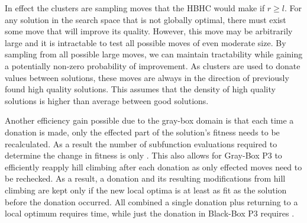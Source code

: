 In effect the clusters are sampling moves that the HBHC
would make if $r \ge l$. For any solution in the search space that is not globally optimal, there
must exist some move that will improve its quality. However, this move may
be arbitrarily large and it is intractable to test all possible moves of even moderate size.
By sampling from all possible large moves, we can maintain tractability while gaining
a potentially non-zero probability of improvement.
As clusters are used to donate values between solutions, these
moves are always in the direction of previously found high quality solutions.
This assumes that the density of high quality solutions is higher than average between good solutions.

Another efficiency gain possible due to the gray-box domain is that each time a
donation is made, only the effected part of the solution's fitness needs to be
recalculated. As a result the number of subfunction evaluations required
to determine the change in fitness is only . This also
allows for Gray-Box P3 to efficiently reapply hill climbing after each
donation as only effected moves need to be rechecked. As a result, a donation
and its resulting modifications from hill climbing are kept only if the
new local optima is at least as fit as the solution before the donation occurred.
All combined a single donation plus returning to a local optimum requires  time,
while just the donation in Black-Box P3 requires .

